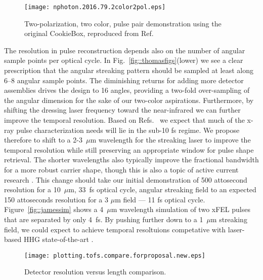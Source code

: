 \begin{wrapfigure}[16]{l}{3in}
\centerline{\texttt{[image: nphoton.2016.79.2color2pol.eps]}}
\caption{\label{fig::2color2polResults}Two-polarization, two color, pulse pair demonstration using the original CookieBox, reproduced from Ref.~\cite{Lutman2016}}
\end{wrapfigure}
The resolution in pulse reconstruction depends also on the number of angular sample points per optical cycle.
In Fig.~\ref{fig::thomasfigs}(lower) we see a clear prescription that the angular streaking pattern should be sampled at least along 6--8 angular sample points.
The diminishing returns for adding more detector assemblies drives the design to 16 angles, providing a two-fold over-sampling of the angular dimension for the sake of our two-color aspirations.
Furthermore, by shifting the dressing laser frequency toward the near-infrared we can further improve the temporal resolution.
Based on Refs.~\cite{lcls2_opportunities,Cederbaum2008,Biggs2012,Mukamel2013} we expect that much of the x-ray pulse characterization needs will lie in the sub-10 fs regime.
We propose therefore to shift to a 2-3~$\mu$m wavelength for the streaking laser to improve the temporal resolution while still preserving an appropriate window for pulse shape retrieval.
The shorter wavelengths also typically improve the fractional bandwidth for a more robust carrier shape, though this is also a topic of active current research \cite{MatthiasTHZschemes}.
This change should take our initial demonstration of 500 attosecond resolution for a 10~$\mu$m, 33~fs optical cycle, angular streaking field to an expected 150 attoseconds resolution for a 3 $\mu$m field --- 11 fs optical cycle.
Figure~\ref{fig::jamessim} shows a 4~$\mu$m wavelength simulation of two xFEL pulses that are separated by only 4~fs.
By pushing further down to a 1~$\mu$m streaking field, we could expect to achieve temporal resoltuions competative with laser-based HHG state-of-the-art \cite{Zenghu2017,HJWorner2017}.

\begin{wrapfigure}[16]{r}{3.5in}
\vspace{-1.5\baselineskip}
\centerline{\texttt{[image: plotting.tofs.compare.forproposal.new.eps]}}
\vspace{-0.5\baselineskip}
\caption{\label{fig::detectorcompare}Detector resolution versus length comparison. }
\end{wrapfigure}

